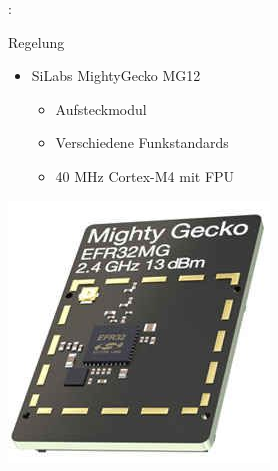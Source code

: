 \documentclass{beamer}
\begin{document}
\begin{frame}{\insertsection: \insertsubsection}
\begin{minipage}{0.45\linewidth}

	Regelung
	\begin{itemize}
		\item SiLabs MightyGecko MG12
		\begin{itemize}
			\item Aufsteckmodul
			\item Verschiedene Funkstandards
			\item 40 MHz Cortex-M4 mit FPU
		\end{itemize}
	\end{itemize}
\end{minipage} \quad
\begin{minipage}{0.45\linewidth}
	\includegraphics[width=\linewidth]{efr32}
\end{minipage}
\end{frame}
\end{document}
